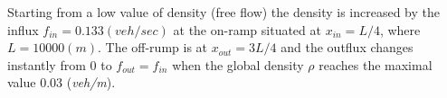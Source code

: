 \begin{references}
Starting from
a low value of density (free flow) the density is increased by the influx
$f_{in}=0.133(veh/sec)$ at the on-ramp situated at $x_{in}=L/4$, where
$L=10000(m)$. The off-rump is at $x_{out}=3L/4$ and the outflux changes
instantly from 0 to $f_{out}=f_{in}$ when the global density $\rho$ reaches
the maximal value 0.03 ({\it veh/m}).


\end{references}




